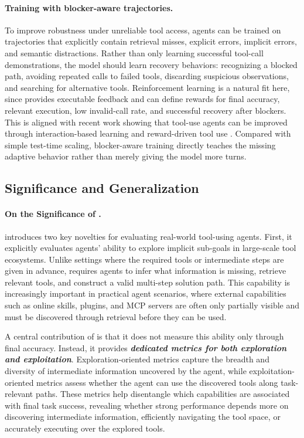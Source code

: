 \paragraph{Training with blocker-aware trajectories.}
To improve robustness under unreliable tool access, agents can be trained on trajectories that explicitly contain retrieval misses, explicit errors, implicit errors, and semantic distractions. Rather than only learning successful tool-call demonstrations, the model should learn recovery behaviors: recognizing a blocked path, avoiding repeated calls to failed tools, discarding suspicious observations, and searching for alternative tools. Reinforcement learning is a natural fit here, since \bench{} provides executable feedback and can define rewards for final accuracy, relevant execution, low invalid-call rate, and successful recovery after blockers. This is aligned with recent work showing that tool-use agents can be improved through interaction-based learning and reward-driven tool use \citep{schick2023toolformer,ToolRL}. Compared with simple test-time scaling, blocker-aware training directly teaches the missing adaptive behavior rather than merely giving the model more turns.


\subsection{Significance and Generalization}
\label{app:significance-generalization}

\paragraph{On the Significance of \bench{}.}

\bench{} introduces two key novelties for evaluating real-world tool-using agents. First, it explicitly evaluates agents' ability to explore implicit sub-goals in large-scale tool ecosystems. Unlike settings where the required tools or intermediate steps are given in advance, \bench{} requires agents to infer what information is missing, retrieve relevant tools, and construct a valid multi-step solution path. This capability is increasingly important in practical agent scenarios, where external capabilities such as online skills, plugins, and MCP servers are often only partially visible and must be discovered through retrieval before they can be used.

A central contribution of \bench{} is that it does not measure this ability only through final accuracy. 
Instead, it provides \textbf{\textit{dedicated metrics for both exploration and exploitation}}. 
Exploration-oriented metrics capture the breadth and diversity of intermediate information uncovered by the agent, while exploitation-oriented metrics assess whether the agent can use the discovered tools along task-relevant paths.
These metrics help disentangle which capabilities are associated with final task success, revealing whether strong performance depends more on discovering intermediate information, efficiently navigating the tool space, or accurately executing over the explored tools.

